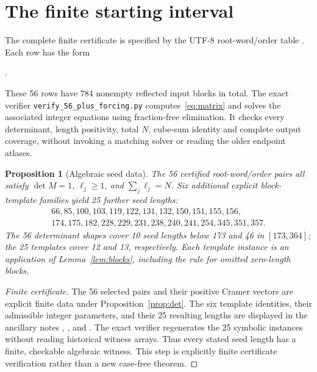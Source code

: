 \documentclass[9pt]{extarticle}
\newtheorem{proposition}[theorem]{Proposition}
\begin{document}
\section{The finite starting interval}\label{sec:finite}
The complete finite certificate is specified by the UTF-8 root-word/order table . Each row has the form
\begin{center}
.
\end{center}
These 56 rows have $784$ nonempty reflected input blocks in total. The exact verifier \texttt{verify\_56\_plus\_forcing.py} computes~\eqref{eq:matrix} and solves the associated integer equations using fraction-free elimination. It checks every determinant, length positivity, total $N$, cube-sum identity and complete output coverage, without invoking a matching solver or reading the older endpoint atlases.

\begin{proposition}[Algebraic seed data]\label{prop:finite}
The 56 certified root-word/order pairs all satisfy $\det M=1$, $\ell_j\ge1$, and $\sum_j\ell_j=N$. Six additional explicit block-template families yield 25 further seed lengths:
\begin{multline*}
66,85,100,103,119,122,131,132,150,151,155,156,\\
174,175,182,228,229,231,238,240,241,254,345,351,357.
\end{multline*}
The 56 determinant shapes cover 10 seed lengths below 173 and 46 in $[173,364]$; the 25 templates cover 12 and 13, respectively. Each template instance is an application of Lemma~\ref{lem:blocks}, including the rule for omitted zero-length blocks.
\end{proposition}
\begin{proof}[Finite certificate]
The 56 selected pairs and their positive Cramer vectors are explicit finite data under Proposition~\ref{prop:det}. The six template identities, their admissible integer parameters, and their 25 resulting lengths are displayed in the ancillary notes , ,  and . The exact verifier regenerates the 25 symbolic instances without reading historical witness arrays. Thus every stated seed length has a finite, checkable algebraic witness. This step is explicitly finite certificate verification rather than a new case-free theorem.
\end{proof}
\end{document}
